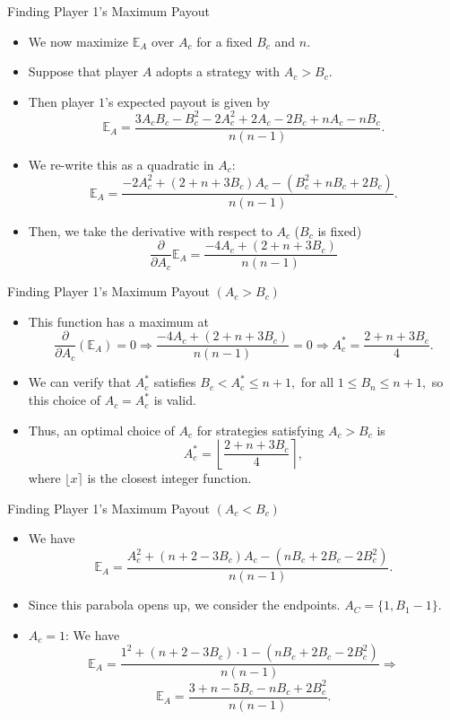\documentclass[aspectratio=169]{beamer}
\begin{document}
\begin{frame}{Finding Player 1's Maximum Payout}
    \begin{itemize}
        \item We now maximize $\mathbb{E}_A$ over $A_c$ for a fixed $B_c$ and $n.$ \pause
        \item  Suppose that player $A$ adopts a strategy with $A_c > B_c.$  \pause
        \item Then player $1$'s expected payout is given by $$\mathbb{E}_A = \frac{3A_cB_c-B_c^2-2A_c^2+2A_c-2B_c+nA_c-nB_c}{n(n-1)}.$$ \pause
        \item We re-write this as a quadratic in $A_c:$ $$\mathbb{E}_A = \frac{-2A_c^2+(2+n+3B_c)A_c-(B_c^2+nB_c+2B_c)}{n(n-1)}.$$ \pause
        \item Then, we take the derivative with respect to $A_c$ ($B_c$ is fixed) $$\frac{\partial}{\partial A_c}\mathbb{E}_A = \frac{-4A_c+(2+n+3B_c)}{n(n-1)}$$ 
        \end{itemize}
    \end{frame}
 \begin{frame}{Finding Player 1's Maximum Payout $(A_c > B_c)$}
    \begin{itemize}
        \item This function has a maximum at $$\frac{\partial}{\partial A_c}(\mathbb{E}_A) = 0 \Longrightarrow\frac{-4A_c+(2+n+3B_c)}{n(n-1)} = 0 \Longrightarrow A_c^{*}=\frac{2+n+3B_c}{4}.$$ \pause
        \item We can verify that $A_c^{*}$ satisfies $B_c <A_c^{*} \leq n+1,$ for all $1 \leq B_n \leq n+1,$ so this choice of $A_c=A_c^{*}$ is valid. \pause
        \item Thus, an optimal choice of $A_c$ for strategies satisfying $A_c > B_c$ is $$A^{*}_c = \left \lfloor \frac{2+n+3B_c}{4} \right \rceil,$$ where $\lfloor x \rceil$  is the closest integer function. 
    \end{itemize}
    \end{frame}
\begin{frame}{Finding Player 1's Maximum Payout $(A_c < B_c)$}
\pause
    \begin{itemize}
        \item We have $$\mathbb{E}_A =\frac{A_c^2+(n+2-3B_c)A_c-(nB_c+2B_c-2B_c^2)}{n(n-1)}.$$ \pause
        \item Since this parabola opens up, we consider the endpoints. $A_C = \{1,B_1-1\}.$ \pause
        \item $A_c=1$: We have $$\mathbb{E}_A =\frac{1^2+(n+2-3B_c)\cdot 1-(nB_c+2B_c-2B_c^2)}{n(n-1)} \Longrightarrow $$$$\mathbb{E}_A =\frac{3+n-5B_c-nB_c+2B_c^2}{n(n-1)}.$$ 
    \end{itemize}
\end{frame}
\end{document}
